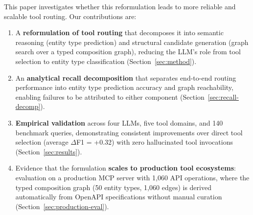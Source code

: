 This paper investigates whether this reformulation leads to more reliable and scalable tool routing.
Our contributions are:

\begin{enumerate}

\item A \textbf{reformulation of tool routing} that decomposes it into semantic reasoning (entity type prediction) and structural candidate generation (graph search over a typed composition graph), reducing the LLM's role from tool selection to entity type classification (Section~\ref{sec:method}).

\item An \textbf{analytical recall decomposition} that separates end-to-end routing performance into entity type prediction accuracy and graph reachability, enabling failures to be attributed to either component (Section~\ref{sec:recall-decomp}).

\item \textbf{Empirical validation} across four LLMs, five tool domains, and 140 benchmark queries, demonstrating consistent improvements over direct tool selection (average $\Delta$F1 = +0.32) with zero hallucinated tool invocations (Section~\ref{sec:results}).

\item Evidence that the formulation \textbf{scales to production tool ecosystems}: evaluation on a production MCP server with 1,060 API operations, where the typed composition graph (50 entity types, 1,060 edges) is derived automatically from OpenAPI specifications without manual curation (Section~\ref{sec:production-eval}).

\end{enumerate}

